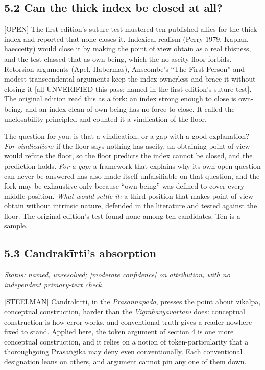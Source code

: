 \documentclass[11pt]{article}
\newcommand{\register}[1]{{\ttfamily\small #1}}
\begin{document}
\subsection*{5.2 Can the thick index be closed at all?}

\register{[OPEN]} The first edition's suture test mustered ten published allies for the thick index and reported that none closes it. Indexical realism (Perry 1979, Kaplan, haecceity) would close it by making the point of view obtain as a real thisness, and the test classed that as own-being, which the no-aseity floor forbids. Retorsion arguments (Apel, Habermas), Anscombe's ``The First Person'' and modest transcendental arguments keep the index ownerless and brace it without closing it [all UNVERIFIED this pass; named in the first edition's suture test]. The original edition read this as a fork: an index strong enough to close is own-being, and an index clean of own-being has no force to close. It called the unclosability principled and counted it a vindication of the floor.

The question for you: is that a vindication, or a gap with a good explanation? \emph{For vindication:} if the floor says nothing has aseity, an obtaining point of view would refute the floor, so the floor predicts the index cannot be closed, and the prediction holds. \emph{For a gap:} a framework that explains why its own open question can never be answered has also made itself unfalsifiable on that question, and the fork may be exhaustive only because ``own-being'' was defined to cover every middle position. \emph{What would settle it:} a third position that makes point of view obtain without intrinsic nature, defended in the literature and tested against the floor. The original edition's test found none among ten candidates. Ten is a sample.

\subsection*{5.3 Candrakīrti's absorption}

\emph{Status: named, unresolved; [moderate confidence] on attribution, with no independent primary-text check.}

\register{[STEELMAN]} Candrakīrti, in the \emph{Prasannapadā}, presses the point about vikalpa, conceptual construction, harder than the \emph{Vigrahavyāvartanī} does: conceptual construction is how error works, and conventional truth gives a reader nowhere fixed to stand. Applied here, the token argument of section 4 is one more conceptual construction, and it relies on a notion of token-particularity that a thoroughgoing Prāsaṅgika may deny even conventionally. Each conventional designation leans on others, and argument cannot pin any one of them down.
\end{document}
